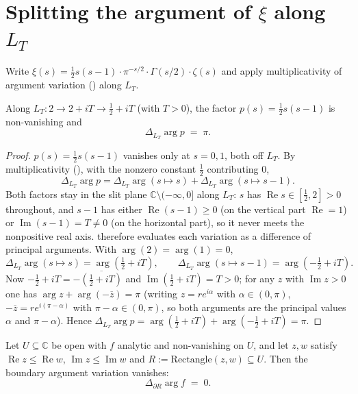 \section{Splitting the argument of \texorpdfstring{$\xi$}{xi} along \texorpdfstring{$L_T$}{L_T}}
\label{sec:nf_split}

Write $\xi(s) = \tfrac12 s(s-1)\cdot\pi^{-s/2}\cdot\Gamma(s/2)\cdot\zeta(s)$ and apply
multiplicativity of argument variation () along $L_T$.

\begin{lemma}
\label{lem:nf_arg_poly}
\leanok
{}
Along $L_T:2\to2+iT\to\tfrac12+iT$ (with $T>0$), the factor $p(s)=\tfrac12 s(s-1)$
is non-vanishing and
\[
  \Delta_{L_T}\arg p \;=\; \pi .
\]
\end{lemma}

\begin{proof}
\leanok
{}
$p(s)=\tfrac12 s(s-1)$ vanishes only at $s=0,1$, both off $L_T$. By
multiplicativity (), with the nonzero constant
$\tfrac12$ contributing $0$,
\[
  \Delta_{L_T}\arg p
  = \Delta_{L_T}\arg(s\mapsto s) + \Delta_{L_T}\arg(s\mapsto s-1).
\]
Both factors stay in the slit plane $\mathbb{C}\setminus(-\infty,0]$ along $L_T$:
$s$ has $\operatorname{Re} s\in[\tfrac12,2]>0$ throughout, and $s-1$ has either
$\operatorname{Re}(s-1)\ge0$ (on the vertical part $\operatorname{Re}=1$) or
$\operatorname{Im}(s-1)=T\neq0$ (on the horizontal part), so it never meets the
nonpositive real axis.  therefore evaluates each variation
as a difference of principal arguments. With $\arg(2)=\arg(1)=0$,
\[
  \Delta_{L_T}\arg(s\mapsto s) = \arg(\tfrac12+iT),
  \qquad
  \Delta_{L_T}\arg(s\mapsto s-1) = \arg(-\tfrac12+iT).
\]
Now $-\tfrac12+iT = -\overline{(\tfrac12+iT)}$ and $\operatorname{Im}(\tfrac12+iT)
=T>0$; for any $z$ with $\operatorname{Im} z>0$ one has
$\arg z + \arg(-\overline{z}) = \pi$ (writing $z=re^{i\alpha}$ with
$\alpha\in(0,\pi)$, $-\overline{z}=re^{i(\pi-\alpha)}$ with $\pi-\alpha\in(0,\pi)$,
so both arguments are the principal values $\alpha$ and $\pi-\alpha$). Hence
$\Delta_{L_T}\arg p = \arg(\tfrac12+iT)+\arg(-\tfrac12+iT)=\pi$.
\end{proof}

\begin{lemma}
\label{lem:nf_rect_argvar_holo_zero}
\leanok
{}
Let $U\subseteq\mathbb{C}$ be open with $f$ analytic and non-vanishing on $U$, and let
$z,w$ satisfy $\operatorname{Re} z\le\operatorname{Re} w$,
$\operatorname{Im} z\le\operatorname{Im} w$ and $R:=\mathrm{Rectangle}(z,w)\subseteq U$.
Then the boundary argument variation vanishes:
\[
  \Delta_{\partial R}\arg f \;=\; 0 .
\]
\end{lemma}

